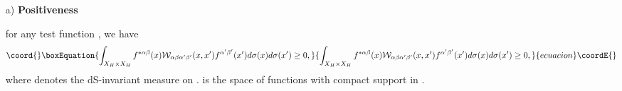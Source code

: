 \documentclass[a4paper,11pt,showpacs,preprintnumbers]{revtex4}
\begin{document}
\begin{enumerate}
\item[a)] {\bf Positiveness}

for any test function \coordHE{}, we have
\begin{equation}\coord{}\boxEquation{
\int _{X_H \times X_H}f^{*\alpha\beta}(x) {\cal
W}_{\alpha\beta\alpha'\beta'}(x,x')
f^{\alpha'\beta'}(x')d\sigma(x)d\sigma(x')\geq 0,
}{
\int _{X_H \times X_H}f^{*\alpha\beta}(x) {\cal
W}_{\alpha\beta\alpha'\beta'}(x,x')
f^{\alpha'\beta'}(x')d\sigma(x)d\sigma(x')\geq 0,
}{ecuacion}\coordE{}\end{equation}
where \coordHE{} denotes the dS-invariant measure on \coordHE{}
\cite{brmo}. \coordHE{} is the space of functions \coordHE{}
with compact support in \coordHE{}.


\end{enumerate}
\end{document}
